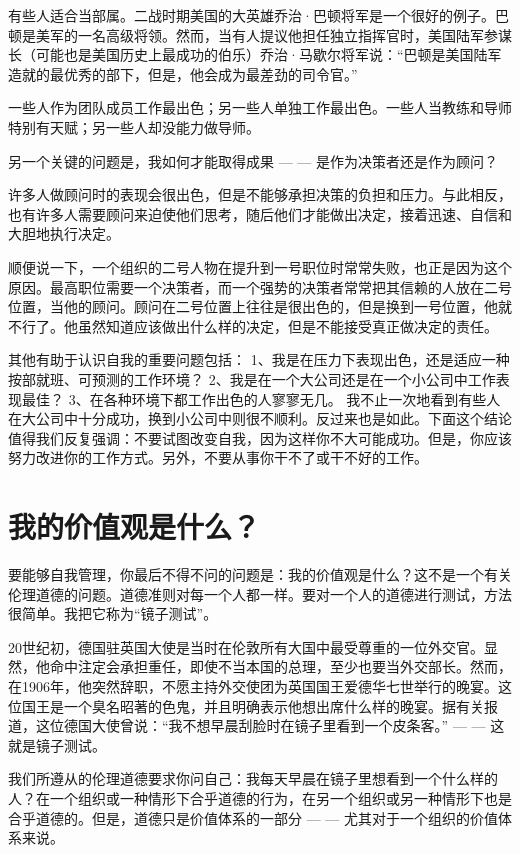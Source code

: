 \documentclass[a4paper,12pt,lang=cn,fontset = windows]{elegantpaper} %
\begin{document}
有些人适合当部属。二战时期美国的大英雄乔治·巴顿将军是一个很好的例子。巴顿是美军的一名高级将领。然而，当有人提议他担任独立指挥官时，美国陆军参谋长（可能也是美国历史上最成功的伯乐）乔治·马歇尔将军说：“巴顿是美国陆军造就的最优秀的部下，但是，他会成为最差劲的司令官。”

一些人作为团队成员工作最出色；另一些人单独工作最出色。一些人当教练和导师特别有天赋；另一些人却没能力做导师。

另一个关键的问题是，我如何才能取得成果 — — 是作为决策者还是作为顾问？

许多人做顾问时的表现会很出色，但是不能够承担决策的负担和压力。与此相反，也有许多人需要顾问来迫使他们思考，随后他们才能做出决定，接着迅速、自信和大胆地执行决定。

顺便说一下，一个组织的二号人物在提升到一号职位时常常失败，也正是因为这个原因。最高职位需要一个决策者，而一个强势的决策者常常把其信赖的人放在二号位置，当他的顾问。顾问在二号位置上往往是很出色的，但是换到一号位置，他就不行了。他虽然知道应该做出什么样的决定，但是不能接受真正做决定的责任。

其他有助于认识自我的重要问题包括：
1、我是在压力下表现出色，还是适应一种按部就班、可预测的工作环境？
2、我是在一个大公司还是在一个小公司中工作表现最佳？
3、在各种环境下都工作出色的人寥寥无几。
我不止一次地看到有些人在大公司中十分成功，换到小公司中则很不顺利。反过来也是如此。下面这个结论值得我们反复强调：不要试图改变自我，因为这样你不大可能成功。但是，你应该努力改进你的工作方式。另外，不要从事你干不了或干不好的工作。

\section{我的价值观是什么？}
要能够自我管理，你最后不得不问的问题是：我的价值观是什么？这不是一个有关伦理道德的问题。道德准则对每一个人都一样。要对一个人的道德进行测试，方法很简单。我把它称为“镜子测试”。

20世纪初，德国驻英国大使是当时在伦敦所有大国中最受尊重的一位外交官。显然，他命中注定会承担重任，即使不当本国的总理，至少也要当外交部长。然而，在1906年，他突然辞职，不愿主持外交使团为英国国王爱德华七世举行的晚宴。这位国王是一个臭名昭著的色鬼，并且明确表示他想出席什么样的晚宴。据有关报道，这位德国大使曾说：“我不想早晨刮脸时在镜子里看到一个皮条客。” — — 这就是镜子测试。

我们所遵从的伦理道德要求你问自己：我每天早晨在镜子里想看到一个什么样的人？在一个组织或一种情形下合乎道德的行为，在另一个组织或另一种情形下也是合乎道德的。但是，道德只是价值体系的一部分 — — 尤其对于一个组织的价值体系来说。
\end{document}
